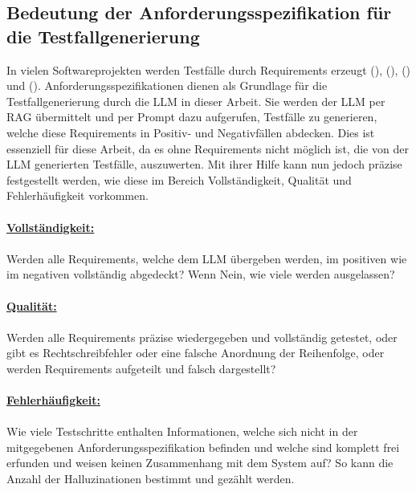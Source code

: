 \documentclass[12pt,toc=bib,toc=listof]{scrreprt}
\begin{document}
\subsection{Bedeutung der Anforderungsspezifikation für die Testfallgenerierung} %
\label{sec:bedeutungDerAnforderungsspezifikationFürDieTestfallgenerierung}
In vielen Softwareprojekten werden Testfälle durch Requirements erzeugt (\cite{Aysolmaz2018}), (\cite{Barmi2011}), (\cite{Mustafa2021}) und (\cite{Visure2024}). Anforderungsspezifikationen dienen als Grundlage für die Testfallgenerierung durch die LLM in dieser Arbeit. Sie werden der LLM per RAG übermittelt und per Prompt dazu aufgerufen, Testfälle zu generieren, welche diese Requirements in Positiv- und Negativfällen abdecken. Dies ist essenziell für diese Arbeit, da es ohne Requirements nicht möglich ist, die von der LLM generierten Testfälle, auszuwerten. Mit ihrer Hilfe kann nun jedoch präzise festgestellt werden, wie diese im Bereich Vollständigkeit, Qualität und Fehlerhäufigkeit vorkommen.\\
\\
\textbf{\underline{Vollständigkeit:}}\\
\\
Werden alle Requirements, welche dem LLM übergeben werden, im positiven wie im negativen vollständig abgedeckt? Wenn Nein, wie viele werden ausgelassen?\\
\\
\textbf{\underline{Qualität:}}\\
\\
Werden alle Requirements präzise wiedergegeben und vollständig getestet, oder gibt es Rechtschreibfehler oder eine falsche Anordnung der Reihenfolge, oder werden Requirements aufgeteilt und falsch dargestellt?\\
\\
\textbf{\underline{Fehlerhäufigkeit:}}\\
\\
Wie viele Testschritte enthalten Informationen, welche sich nicht in der mitgegebenen Anforderungsspezifikation befinden und welche sind komplett frei erfunden und weisen keinen Zusammenhang mit dem System auf? So kann die Anzahl der Halluzinationen bestimmt und gezählt werden.
\end{document}
